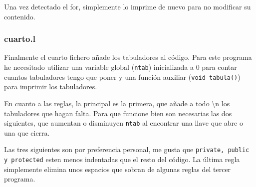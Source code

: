 \documentclass[10pt]{article}
\begin{document}
    Una vez detectado el for, simplemente lo imprime de nuevo para no modificar su contenido.

    \subsubsection{cuarto.l}

    Finalmente el cuarto fichero añade los tabuladores al código. Para este programa he necesitado utilizar una variable global (\texttt{ntab}) inicializada a 0 para contar cuantos tabuladores tengo que poner y una función auxiliar (\texttt{void tabula()}) para imprimir los tabuladores.

    En cuanto a las reglas, la principal es la primera, que añade a todo \textbackslash n los tabuladores que hagan falta. Para que funcione bien son necesarias las dos siguientes, que aumentan o disminuyen \texttt{ntab} al encontrar una llave que abre o una que cierra.

    Las tres siguientes son por preferencia personal, me gusta que \texttt{private, public y protected} esten menos indentadas que el resto del código. La última regla simplemente elimina unos espacios que sobran de algunas reglas del tercer programa.
\end{document}
